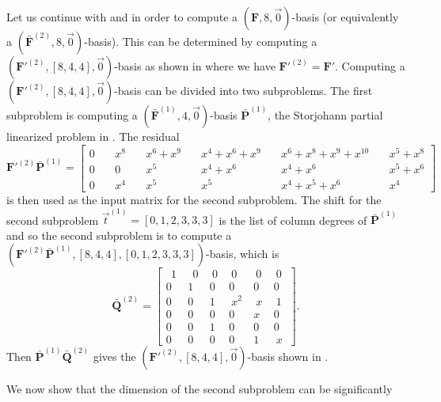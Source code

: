 \begin{example}
\label{exm:subproblems} Let us continue with 
and  in order to compute a
$\left(\mathbf{F},8,\vec{0}\right)$-basis (or equivalently a $(\bar{\mathbf{F}}^{\left(2\right)},8,\vec{0})$-basis).
This can be determined by computing a $(\mathbf{F}'^{\left(2\right)},[8,4,4],\vec{0})$-basis
as shown in  where we have
$\mathbf{F}'^{\left(2\right)}=\mathbf{F}'$. Computing a $(\mathbf{F}'^{\left(2\right)},[8,4,4],\vec{0})$-basis
can be divided into two subproblems. The first subproblem is computing
a $(\bar{\mathbf{F}}^{\left(1\right)},4,\vec{0})$-basis $\bar{\mathbf{P}}^{\left(1\right)}$,
the Storjohann partial linearized problem in .
The residual 
\[
\mathbf{F}'^{(2)}\bar{\mathbf{P}}^{(1)}=\left[{\begin{array}{rcccccccccc}
0 & \  & x^{8} & \  & x^{6}+x^{9} & \  & x^{4}+x^{6}+x^{9} & \  & x^{6}+x^{8}+x^{9}+x^{10} & \  & x^{5}+x^{8}\\
0 &  & 0 &  & x^{5} &  & x^{4}+x^{6} &  & x^{4}+x^{6} &  & x^{5}+x^{6}\\
0 &  & x^{4} &  & x^{5} &  & x^{5} &  & x^{4}+x^{5}+x^{6} &  & x^{4}
\end{array}}\right]
\]
 is then used as the input matrix for the second subproblem. The shift
for the second subproblem $\vec{t}^{(1)}=[0,1,2,3,3,3]$ is the list
of column degrees of $\bar{\mathbf{P}}^{(1)}$ and so the second subproblem
is to compute a $(\mathbf{F}'^{(2)}\bar{\mathbf{P}}^{(1)},\left[8,4,4\right],[0,1,2,3,3,3])$-basis,
which is 
\begin{equation}
\bar{\mathbf{Q}}^{(2)}=\left[{\begin{array}{cccccc}
~~1~ & ~~0~ & ~0~ & ~0~ & ~0~ & ~0~\\
0 & 1 & 0 & 0 & 0 & 0\\
0 & 0 & 1 & ~x^{2}~ & ~x~ & ~1~\\
0 & 0 & 0 & 0 & x & 0\\
0 & 0 & 1 & 0 & 0 & 0\\
0 & 0 & 0 & 0 & 1 & ~x~
\end{array}}\right].\label{eq:Qbar2}
\end{equation}
 Then $\bar{\mathbf{P}}^{(1)}\bar{\mathbf{Q}}^{(2)}$ gives the $(\mathbf{F}'^{\left(2\right)},[8,4,4],\vec{0})$-basis
shown in . 
\end{example}
We now show that the dimension of the second subproblem can be significantly
